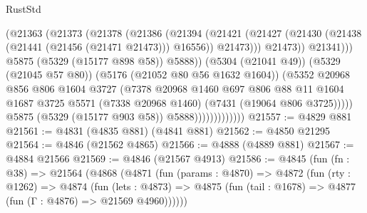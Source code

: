 \begin{lexlean}{RustStd}
\begin{coremodule}
                                      (@21363
                                        (@21373
                                          (@21378
                                            (@21386
                                              (@21394
                                                (@21421
                                                  (@21427
                                                    (@21430
                                                      (@21438
                                                        (@21441 (@21456 (@21471 @21473)))
                                                        @16556))
                                                    @21473)))
                                              @21473))
                                          @21341)))
                                    @5875
                                    (@5329 (@15177 @898 @58))
                                    @5888))
                                (@5304 (@21041 @49))
                                (@5329 (@21045 @57 @80))
                                (@5176 (@21052 @80 @56 @1632 @1604))
                                (@5352
                                  @20968
                                  @856
                                  @806
                                  @1604
                                  @3727
                                  (@7378
                                    @20968
                                    @1460
                                    @697
                                    @806
                                    @88
                                    @11
                                    @1604
                                    @1687
                                    @3725
                                    @5571
                                    (@7338 @20968 @1460)
                                    (@7431 (@19064 @806 @3725)))))
                              @5875
                              (@5329 (@15177 @903 @58))
                              @5888)))))))))))))
@21557 := @4829 @881
@21561 := @4831 (@4835 @881) (@4841 @881)
@21562 := @4850 @21295
@21564 := @4846 (@21562 @4865)
@21566 := @4888 (@4889 @881)
@21567 := @4884 @21566
@21569 := @4846 (@21567 @4913)
@21586 := @4845
    (fun (fn : @38) =>
    @21564
      (@4868
        (@4871
          (fun (params : @4870) =>
          @4872
            (fun (rty : @1262) =>
            @4874
              (fun (lets : @4873) =>
              @4875 (fun (tail : @1678) => @4877 (fun (Γ : @4876) => @21569 @4960))))))

\end{coremodule}
\end{lexlean}
